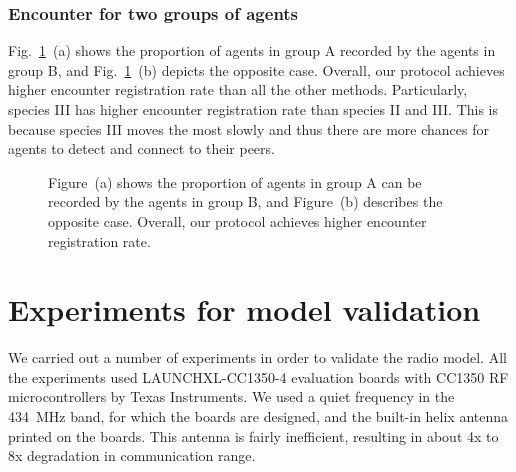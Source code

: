\subsubsection{Encounter for two groups of agents}

Fig.~\ref{fig9}~(a) shows the proportion of agents in group A 
recorded by the agents in group B, and Fig.~\ref{fig9}~(b) depicts
the opposite case. Overall, our protocol achieves higher encounter 
registration rate than all the other methods. Particularly, species III
has higher encounter registration rate than species II and III.
This is because species III moves the most slowly and thus there are more 
chances for agents to detect and connect to their peers. 

\begin{figure}[h]
    \centering
    \hspace{0.01in}
    \caption{Figure~(a) shows the proportion of agents in group A can 
    be recorded by the agents in group B, and Figure~(b) describes
    the opposite case. Overall, our protocol
    achieves higher encounter registration rate.}
    \label{fig9}
\end{figure}

\section{Experiments for model validation}
\label{experiments}

We carried out a number of experiments in order to validate the radio model. 
All the experiments used LAUNCHXL-CC1350-4 evaluation boards with CC1350 RF microcontrollers by Texas Instruments.
We used a quiet frequency in the 434~MHz band, for which the boards are
designed, and the built-in helix antenna printed on the boards.
This antenna is fairly inefficient, resulting in about 4x to 8x degradation in communication range. 

